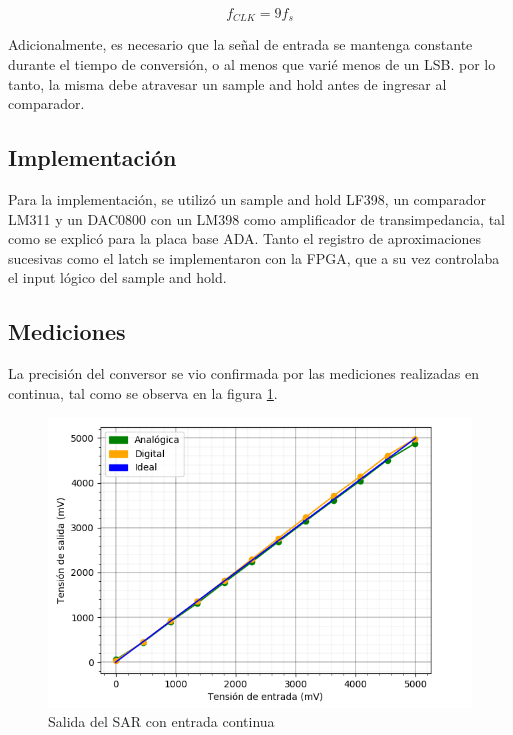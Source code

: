 \documentclass[assd_tp3_main.tex]{subfiles}
\begin{document}
\begin{equation}
	f_{CLK} = 9f_s
\end{equation} 

Adicionalmente, es necesario que la se\~nal de entrada se mantenga constante durante el tiempo de conversi\'on, o al menos que vari\'e menos de un LSB. por lo tanto, la misma debe atravesar un sample and hold antes de ingresar al comparador.



\subsection{Implementaci\'on}

Para la implementaci\'on, se utiliz\'o un sample and hold LF398, un comparador LM311 y un DAC0800 con un LM398 como amplificador de transimpedancia, tal como se explic\'o para la placa base ADA. Tanto el registro de aproximaciones sucesivas como el latch se implementaron con la FPGA, que a su vez controlaba el input l\'ogico del sample and hold. 


\subsection{Mediciones}

La precisi\'on del conversor se vio confirmada por las mediciones realizadas en continua, tal como se observa en la figura \ref{fig:sar-continua}.

\begin{figure}[htb!]
	\centering
	\includegraphics[width=\textwidth]
	{images/ej2/sar-continua.png}
	\caption{Salida del SAR con entrada continua}
	\label{fig:sar-continua}
\end{figure}
\end{document}
